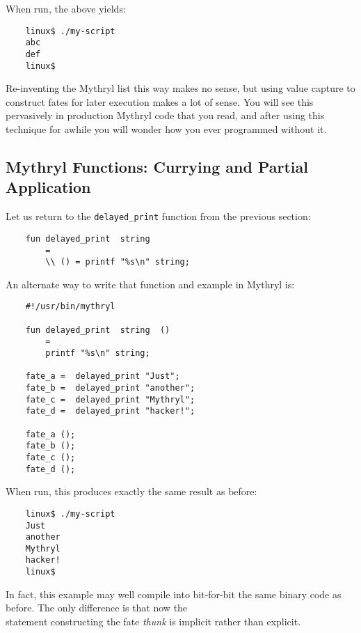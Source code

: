 When run, the above yields:

\begin{verbatim}
    linux$ ./my-script
    abc
    def
    linux$ 
\end{verbatim}
     
Re-inventing the Mythryl list this way makes no sense, but using value 
capture to construct fates for later execution makes 
a lot of sense.  You will see this pervasively in production Mythryl 
code that you read, and after using this technique for awhile you will 
wonder how you ever programmed without it.

\cutend*

\subsection{Mythryl Functions:  Currying and Partial Application}

Let us return to the {\tt delayed\_print} function from the 
previous section:

\begin{verbatim}
    fun delayed_print  string
        =
        \\ () = printf "%s\n" string;
\end{verbatim}

An alternate way to write that function and example in Mythryl is:

\begin{verbatim}
    #!/usr/bin/mythryl

    fun delayed_print  string  ()
        =
        printf "%s\n" string;

    fate_a =  delayed_print "Just";
    fate_b =  delayed_print "another";
    fate_c =  delayed_print "Mythryl";
    fate_d =  delayed_print "hacker!";

    fate_a ();
    fate_b ();
    fate_c ();
    fate_d ();
\end{verbatim}

When run, this produces exactly the same result as before:

\begin{verbatim}
    linux$ ./my-script
    Just
    another
    Mythryl
    hacker!
    linux$
\end{verbatim}

In fact, this example may well compile into bit-for-bit the same binary 
code as before.  The only difference is that now the {\tt \\} statement 
constructing the fate {\it thunk} is implicit rather than explicit. 

